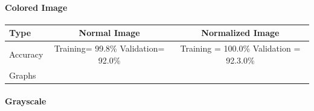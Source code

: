 \documentclass[11pt]{article}
\begin{document}
\hypertarget{colored-image-1}{%
\paragraph{Colored Image}\label{colored-image-1}}

\begin{longtable}[]{@{}lcc@{}}
\toprule
\begin{minipage}[b]{0.24\columnwidth}\raggedright
Type\strut
\end{minipage} & \begin{minipage}[b]{0.34\columnwidth}\centering
Normal Image\strut
\end{minipage} & \begin{minipage}[b]{0.34\columnwidth}\centering
Normalized Image\strut
\end{minipage}\tabularnewline
\midrule
\endhead
\begin{minipage}[t]{0.24\columnwidth}\raggedright
Accuracy\strut
\end{minipage} & \begin{minipage}[t]{0.34\columnwidth}\centering
Training= 99.8\% Validation= 92.0\%\strut
\end{minipage} & \begin{minipage}[t]{0.34\columnwidth}\centering
Training = 100.0\% Validation = 92.3.0\%\strut
\end{minipage}\tabularnewline
\begin{minipage}[t]{0.24\columnwidth}\raggedright
Graphs\strut
\end{minipage} & \begin{minipage}[t]{0.34\columnwidth}\centering
\strut
\end{minipage} & \begin{minipage}[t]{0.34\columnwidth}\centering
\strut
\end{minipage}\tabularnewline
\bottomrule
\end{longtable}

\hypertarget{grayscale-1}{%
\paragraph{Grayscale}\label{grayscale-1}}
\end{document}
